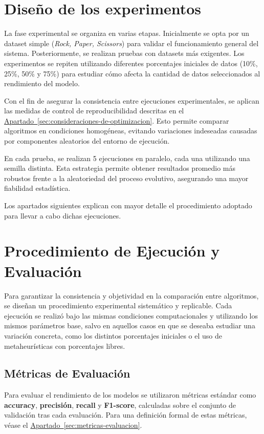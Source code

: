 \section{Diseño de los experimentos}\label{sec:diseño-de-los-experimentos}
La fase experimental se organiza en varias etapas.
Inicialmente se opta por un dataset simple (\textit{Rock, Paper, Scissors}) para validar el funcionamiento general del sistema.
Posteriormente, se realizan pruebas con datasets más exigentes.
Los experimentos se repiten utilizando diferentes porcentajes iniciales de datos (10\%, 25\%, 50\% y 75\%)
para estudiar cómo afecta la cantidad de datos seleccionados al rendimiento del modelo.

Con el fin de asegurar la consistencia entre ejecuciones experimentales, se aplican las medidas de control de reproducibilidad
descritas en el \hyperref[sec:consideraciones-de-optimizacion]{Apartado~\ref*{sec:consideraciones-de-optimizacion}}.
Esto permite comparar algoritmos en condiciones homogéneas, evitando variaciones indeseadas causadas por componentes aleatorios del entorno de ejecución.

En cada prueba, se realizan 5 ejecuciones en paralelo, cada una utilizando una semilla distinta.
Esta estrategia permite obtener resultados promedio más robustos frente a la aleatoriedad del proceso evolutivo, asegurando una mayor fiabilidad estadística.

Los apartados siguientes explican con mayor detalle el procedimiento adoptado para llevar a cabo dichas ejecuciones.


\section{Procedimiento de Ejecución y Evaluación}\label{sec:procedimiento-de-ejecucion-y-evaluacion}
Para garantizar la consistencia y objetividad en la comparación entre algoritmos, se diseñan un procedimiento experimental sistemático y replicable.
Cada ejecución se realizó bajo las mismas condiciones computacionales y utilizando los mismos parámetros base,
salvo en aquellos casos en que se deseaba estudiar una variación concreta, como los distintos porcentajes iniciales o el uso de metaheurísticas con porcentajes libres.

\subsection{Métricas de Evaluación}\label{sec:metricas-de-evaluacion}
Para evaluar el rendimiento de los modelos se utilizaron métricas estándar como \textbf{accuracy}, \textbf{precisión}, \textbf{recall} y \textbf{F1-score},
calculadas sobre el conjunto de validación tras cada evaluación.
Para una definición formal de estas métricas, véase el \hyperref[sec:metricas-evaluacion]{Apartado~\ref*{sec:metricas-evaluacion}}.

